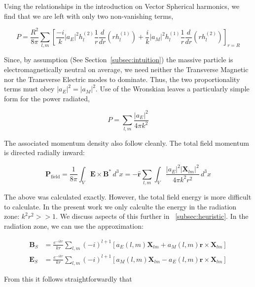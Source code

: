 \documentclass {article}
\renewcommand\vec{\mathbf}
\let\OldHat\hat
\renewcommand{\hat}[1]{\OldHat{\mathbf{#1}}}
\begin{document}
Using the relationships in the introduction on Vector Spherical harmonics, we find that we are left with only two non-vanishing terms,

\begin{equation}
P = \frac {R^2}{8 \pi} \sum_{l, m} \left[  \frac {-i} k |a_E|^2 h_l^{(2)} \frac 1 r \frac d {dr} \left( rh_l^{(1)} \right) + \frac i k |a_M|^2 h_l^{(1)} \frac 1 r \frac d {dr} \left( rh_l^{(2)}\right) \right]_{r=R}
\end{equation}

Since, by assumption (See Section~\ref{subsec:intuition}) the massive particle is electromagnetically neutral on average, we need neither the Transverse Magnetic nor the Transverse Electric modes to dominate. Thus, the two proportionality terms must obey $|a_E|^2 = |a_M|^2$. Use of the Wronskian leaves a particularly simple form for the power radiated,


\begin{equation}
P = \sum_{l,m} \frac {|a_E|^2} { 4 \pi k^2}
\end{equation}

The associated momentum density also follow cleanly. The total field momentum is directed radially inward:

\begin{equation}
\vec{P}_{\text{field}} = \frac{1}{8\pi} \int_V \vec{E} \times \vec{B}^* \, d^3x
= -\hat{r} \sum_{l,m} \int_V \frac{|a_E|^2 |\vec{X}_{lm}|^2}{4\pi k^2 r^2} \, d^3x
\label{eq:mom}
\end{equation}


The above was calculated exactly. However, the total field energy is more difficult to calculate. In the present work we only calculte the energy in the radiation zone: $k^2 r^2  >> 1$. We discuss aspects of this further in ~\ref{subsec:heuristic}. In the radiation zone, we can use the approximation:


\begin{equation}
\begin{aligned}
\vec{B}_S &= \frac {e^{-ikr}} {kr}  \sum_{l,m}  (-i)^{l+1}    \left[
a_E(l,m) \vec{X}_{lm}
+ a_M(l,m) \hat{r} \times  \vec{X}_{lm} 
\right] \\
\vec{E}_S &= \frac {e^{-ikr}} {kr} \sum_{l,m}  (-i)^{l+1}   \left[
a_M(l,m) \vec{X}_{lm}
- a_E(l,m) \hat{r} \times  \vec{X}_{lm} 
\right] 
\end{aligned}
\end{equation}

From this it follows straightforwardly that 
\end{document}
